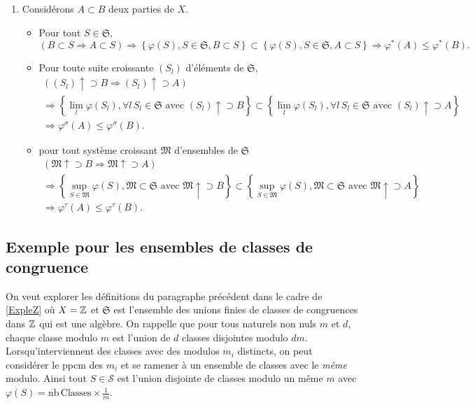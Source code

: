 \begin{demo}
\begin{enumerate}
  \item Considérons $A \subset B$ deux parties de $X$.
  \begin{itemize}
   \item Pour tout $S \in \mathfrak{S}$,
\begin{displaymath}
 \left( B \subset S \Rightarrow A \subset S \right)
   \Rightarrow
   \left\lbrace \varphi(S), S \in \mathfrak{S}, B \subset S\right\rbrace \subset \left\lbrace \varphi(S), S \in \mathfrak{S}, A \subset S\right\rbrace
   \Rightarrow
   \varphi^*(A) \leq \varphi^*(B).
\end{displaymath}
    \item Pour toute suite croissante $(S_l)$ d'éléments de $\mathfrak{S}$,
\begin{multline*}
 \left( (S_l)\uparrow \supset B \Rightarrow (S_l) \uparrow \supset A \right) \\
   \Rightarrow
   \left\lbrace \lim_l\varphi(S_l), \forall l\, S_l \in \mathfrak{S} \text{ avec } (S_l)\uparrow \supset B\right\rbrace
     \subset
  \left\lbrace \lim_l\varphi(S_l), \forall l\, S_l \in \mathfrak{S} \text{ avec } (S_l)\uparrow \supset A\right\rbrace \\
   \Rightarrow
   \varphi^\sigma(A) \leq \varphi^\sigma(B).
\end{multline*}
    \item pour tout système croissant $\mathfrak{M}$ d'ensembles de $\mathfrak{S}$
\begin{multline*}
 \left( \mathfrak{M}\uparrow \supset B \Rightarrow \mathfrak{M} \uparrow \supset A \right) \\
   \Rightarrow
   \left\lbrace \sup_{S \in \mathfrak{M}}\varphi(S), \mathfrak{M} \subset \mathfrak{S} \text{ avec } \mathfrak{M}\uparrow \supset B\right\rbrace
     \subset
  \left\lbrace \sup_{S \in \mathfrak{M}}\varphi(S), \mathfrak{M} \subset \mathfrak{S} \text{ avec } \mathfrak{M}\uparrow \supset A\right\rbrace \\
   \Rightarrow
   \varphi^\tau(A) \leq \varphi^\tau(B).
\end{multline*}
\end{itemize}
 \end{enumerate}
\end{demo}

\subsection{Exemple pour les ensembles de classes de congruence}
On veut explorer les définitions du paragraphe précédent dans le cadre de \ref{ExpleZ} où $X= \mathbb{Z}$ et $\mathfrak{S}$ est l'ensemble des unions finies de classes de congruences dans $\mathbb{Z}$ qui est une algèbre.\newline
On rappelle que pour tous naturels non nuls $m$ et $d$, chaque classe modulo $m$ est l'union de $d$ classes disjointes modulo $dm$. Lorsqu'interviennent des classes avec des modulos $m_i$ distincts, on peut considérer le ppcm des $m_i$ et se ramener à un ensemble de classes avec le \emph{même} modulo. Ainsi tout $S\in \mathcal{S}$ est l'union disjointe de classes modulo un même $m$ avec $\varphi(S) = \mathrm{nb\, Classes}\times \frac{1}{m}$.

